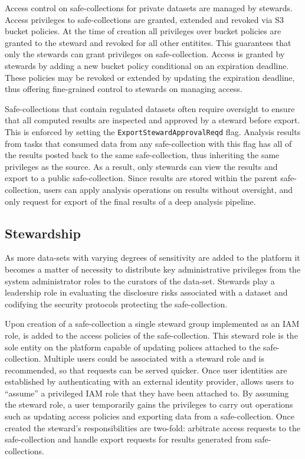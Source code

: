 Access control on safe-collections for private datasets are managed by stewards. Access privileges to
safe-collections are granted, extended and revoked via S3 bucket policies. At the time of creation all
privileges over bucket policies are granted to the steward and revoked for all other entitites. This
guarantees that only the stewards can grant privileges on safe-collection. Access is granted by stewards
by adding a new bucket policy conditional on an expiration deadline. These policies may be revoked or
extended by updating the expiration deadline, thus offering fine-grained control to stewards on managing
access.


Safe-collections that contain regulated datasets often require oversight to ensure that all computed results
are inspected and approved by a steward before export. This is enforced by setting the
\texttt{ExportStewardApprovalReqd} flag.
Analysis results from tasks that consumed data from any safe-collection with this flag has all of the
results posted back to the same safe-collection, thus inheriting the same privileges as the source.
As a result, only stewards can view the results and export to a public safe-collection. Since results are
stored within the parent safe-collection, users can apply analysis operations on results without oversight,
and only request for export of the final results of a deep analysis pipeline.

\subsection{Stewardship}

As more data-sets with varying degrees of sensitivity are added to the \NAME platform it becomes a matter
of necessity to distribute key administrative privileges from the system administrator roles to the curators
of the data-set. Stewards play a leadership role in evaluating the disclosure risks associated with a
dataset and codifying the security protocols protecting the safe-collection.

Upon creation of a safe-collection a single steward group implemented as an IAM role, is added to the
access policies of the safe-collection. This steward role is the sole entity on the platform capable of
updating polices attached to the safe-collection.
Multiple users could be associated with a steward role and is recommended, so that requests can be served quicker.
Once user identities are established by authenticating with an external identity provider,
\NAME allows users to ``assume'' a privileged IAM role that they have been attached to.
By assuming the steward role, a user temporarily gains the privileges to carry out operations such
as updating access policies and exporting data from a safe-collection.
Once created the steward's responsibilities are two-fold: arbitrate access requests to the safe-collection and
handle export requests for results generated from safe-collections.

